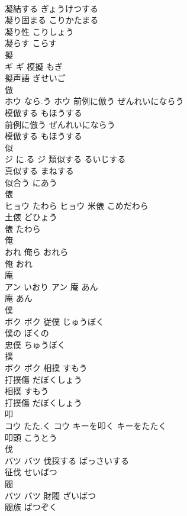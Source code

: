 \documentclass[8pt]{extreport}
\begin{document}
\begin{CJK}{UTF8}{min}
\\	凝結する	ぎょうけつする	
\\	凝り固まる	こりかたまる	
\\	凝り性	こりしょう	
\\	凝らす	こらす	
\\	擬	
\\	ギ		ギ	模擬	もぎ	
\\	擬声語	ぎせいご	
\\	倣	
\\	ホウ	なら.う	ホウ	前例に倣う	ぜんれいにならう	
\\	模倣する	もほうする	
\\	前例に倣う	ぜんれいにならう	
\\	模倣する	もほうする	
\\	似	
\\	ジ	に.る	ジ	類似する	るいじする	
\\	真似する	まねする	
\\	似合う	にあう	
\\	俵	
\\	ヒョウ	たわら	ヒョウ	米俵	こめだわら	
\\	土俵	どひょう	
\\	俵	たわら	
\\	俺	
\\	おれ		俺ら	おれら	
\\	俺	おれ	
\\	庵	
\\	アン	いおり	アン	庵	あん	
\\	庵	あん	
\\	僕	
\\	ボク		ボク	従僕	じゅうぼく	
\\	僕の	ぼくの	
\\	忠僕	ちゅうぼく	
\\	撲	
\\	ボク		ボク	相撲	すもう	
\\	打撲傷	だぼくしょう	
\\	相撲	すもう	
\\	打撲傷	だぼくしょう	
\\	叩	
\\	コウ	たた.く	コウ	キーを叩く	キーをたたく	
\\	叩頭	こうとう	
\\	伐	
\\	バツ		バツ	伐採する	ばっさいする	
\\	征伐	せいばつ	
\\	閥	
\\	バツ		バツ	財閥	ざいばつ	
\\	閥族	ばつぞく	

\end{CJK}
\end{document}
